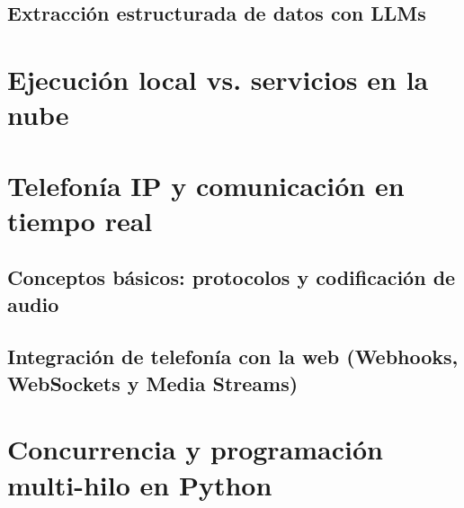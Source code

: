 \textoBase

\subsection{Extracción estructurada de datos con LLMs}
\label{subsec:extraccion_estructurada}

\textoBaseAlt

\section{Ejecución local vs. servicios en la nube}
\label{sec:local_vs_cloud}

\textoBase

\section{Telefonía IP y comunicación en tiempo real}
\label{sec:telefonia_ip}

\textoBase

\subsection{Conceptos básicos: protocolos y codificación de audio}
\label{subsec:protocolos_audio}

\textoBaseAlt

\subsection{Integración de telefonía con la web (Webhooks, WebSockets y Media Streams)}
\label{subsec:telefonia_web}

\textoBase

\section{Concurrencia y programación multi-hilo en Python}
\label{sec:concurrencia_python}

\textoBaseAlt

